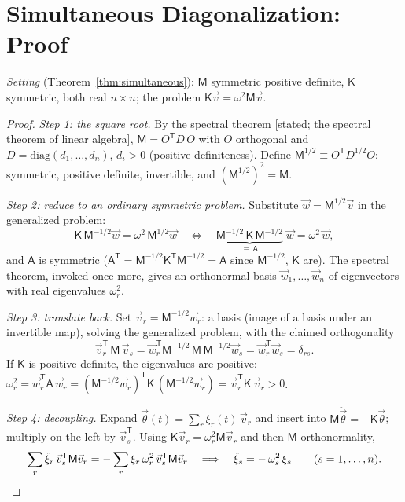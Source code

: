 \documentclass[11pt]{article}
\theoremstyle{plain}
\theoremstyle{definition}
\theoremstyle{remark}
\newcommand{\vth}{\vec{\theta}}
\newcommand{\mM}{\mathsf{M}}
\newcommand{\mK}{\mathsf{K}}
\begin{document}
\section{Simultaneous Diagonalization: Proof}
\label{app:simultaneous}

\emph{Setting} (Theorem~\ref{thm:simultaneous}): $\mM$ symmetric positive
definite, $\mK$ symmetric, both real $n\times n$; the problem
$\mK\vec v = \omega^2 \mM \vec v$.

\begin{proof}
\emph{Step 1: the square root.} By the spectral theorem [stated; the
spectral theorem of linear algebra], $\mM = O^{\mathsf
T} D\, O$ with $O$ orthogonal and $D = \mathrm{diag}(d_1,\dots,d_n)$,
$d_i > 0$ (positive definiteness). Define
$\mM^{1/2} \equiv O^{\mathsf T} D^{1/2} O$: symmetric, positive definite,
invertible, and $(\mM^{1/2})^2 = \mM$.

\emph{Step 2: reduce to an ordinary symmetric problem.} Substitute
$\vec w = \mM^{1/2}\vec v$ in the generalized problem:
\begin{equation}
  \mK\,\mM^{-1/2}\vec w = \omega^2\,\mM^{1/2}\vec w
  \quad\Longleftrightarrow\quad
  \underbrace{\mM^{-1/2}\,\mK\,\mM^{-1/2}}_{\equiv\,\mathsf A}\;\vec w
  = \omega^2\,\vec w ,
\end{equation}
and $\mathsf A$ is symmetric
($\mathsf A^{\mathsf T} = \mM^{-1/2}\mK^{\mathsf T}\mM^{-1/2} = \mathsf A$
since $\mM^{-1/2}$, $\mK$ are). The spectral theorem, invoked once
more, gives an
orthonormal basis $\vec w_1,\dots,\vec w_n$ of eigenvectors with real
eigenvalues $\omega_r^2$.

\emph{Step 3: translate back.} Set $\vec v_r = \mM^{-1/2}\vec w_r$: a
basis (image of a basis under an invertible map), solving the generalized
problem, with the claimed orthogonality
\begin{equation}
  \vec v_r^{\mathsf T}\,\mM\,\vec v_s
  = \vec w_r^{\mathsf T}\mM^{-1/2}\,\mM\,\mM^{-1/2}\vec w_s
  = \vec w_r^{\mathsf T}\vec w_s = \delta_{rs} .
\end{equation}
If $\mK$ is positive definite, the eigenvalues are positive:
$\omega_r^2 = \vec w_r^{\mathsf T}\mathsf A\,\vec w_r
= (\mM^{-1/2}\vec w_r)^{\mathsf T}\mK\,(\mM^{-1/2}\vec w_r)
= \vec v_r^{\mathsf T}\mK\,\vec v_r > 0$.

\emph{Step 4: decoupling.} Expand $\vth(t) = \sum_r \xi_r(t)\,\vec v_r$
and insert into $\mM\ddot\vth = -\mK\vth$; multiply on the left by
$\vec v_s^{\mathsf T}$. Using $\mK\vec v_r = \omega_r^2\mM\vec v_r$ and
then $\mM$-orthonormality,
\begin{equation}
  \sum_r \ddot\xi_r\,\vec v_s^{\mathsf T}\mM\vec v_r
  = -\sum_r \xi_r\,\omega_r^2\,\vec v_s^{\mathsf T}\mM\vec v_r
  \quad\Longrightarrow\quad
  \ddot\xi_s = -\,\omega_s^2\,\xi_s
  \qquad (s = 1,\dots,n) . \qedhere
\end{equation}
\end{proof}
\end{document}
